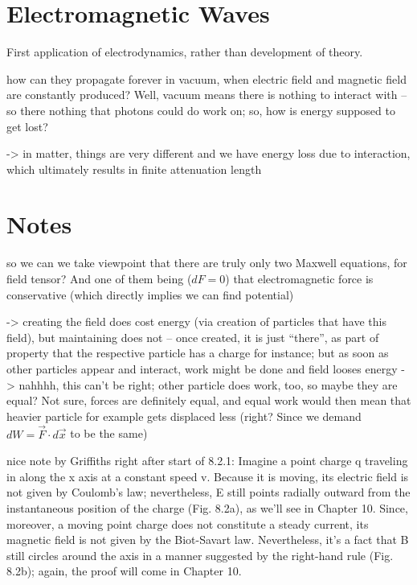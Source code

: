 \documentclass[../class_mech_main.tex]{subfiles}
\begin{document}
    \section{Electromagnetic Waves}
First application of electrodynamics, rather than development of theory.






how can they propagate forever in vacuum, when electric field and magnetic field are constantly produced? Well, vacuum means there is nothing to interact with -- so there nothing that photons could do work on; so, how is energy supposed to get lost?


-> in matter, things are very different and we have energy loss due to interaction, which ultimately results in finite attenuation length



    \section{Notes}

so we can we take viewpoint that there are truly only two Maxwell equations, for field tensor? And one of them being ($dF = 0$) that electromagnetic force is conservative (which directly implies we can find potential)



-> creating the field does cost energy (via creation of particles that have this field), but maintaining does not -- once created, it is just \enquote{there}, as part of property that the respective particle has a charge for instance; but as soon as other particles appear and interact, work might be done and field looses energy -> nahhhh, this can't be right; other particle does work, too, so maybe they are equal? Not sure, forces are definitely equal, and equal work would then mean that heavier particle for example gets displaced less (right? Since we demand $dW = \vec{F} \cdot d\vec{x}$ to be the same)



nice note by Griffiths right after start of 8.2.1: Imagine a point charge q traveling in along the x axis at a constant speed v. Because it is moving, its electric field is not given by Coulomb's law; nevertheless, E still points radially outward from the instantaneous position of the charge (Fig. 8.2a), as we'll see in Chapter 10. Since, moreover, a moving point charge does not constitute a steady current, its magnetic field is not given by the Biot-Savart law. Nevertheless, it's a fact that B still circles around the axis in a manner suggested by the right-hand rule (Fig. 8.2b); again, the proof will come in Chapter 10.
\end{document}
